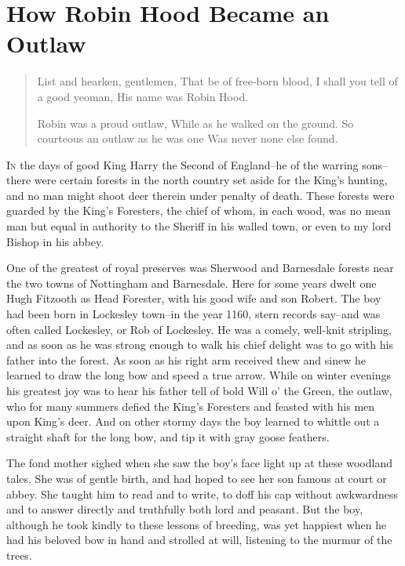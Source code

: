 \chapter{How Robin Hood Became an Outlaw}

\begin{quote}
List and hearken, gentlemen,
That be of free-born blood,
I shall you tell of a good yeoman,
His name was Robin Hood.

Robin was a proud outlaw,
While as he walked on the ground.
So courteous an outlaw as he was one
Was never none else found.
\end{quote}

\lettrine{I}{n} the days of good King Harry the Second of England--he of the warring
sons--there were certain forests in the north country set aside for the
King's hunting, and no man might shoot deer therein under penalty of
death. These forests were guarded by the King's Foresters, the chief of
whom, in each wood, was no mean man but equal in authority to the
Sheriff in his walled town, or even to my lord Bishop in his abbey.

One of the greatest of royal preserves was Sherwood and Barnesdale
forests near the two towns of Nottingham and Barnesdale. Here for some
years dwelt one Hugh Fitzooth as Head Forester, with his good wife and
son Robert. The boy had been born in Lockesley town--in the year 1160,
stern records say--and was often called Lockesley, or Rob of Lockesley.
He was a comely, well-knit stripling, and as soon as he was strong
enough to walk his chief delight was to go with his father into the
forest. As soon as his right arm received thew and sinew he learned to
draw the long bow and speed a true arrow. While on winter evenings his
greatest joy was to hear his father tell of bold Will o' the Green, the
outlaw, who for many summers defied the King's Foresters and feasted
with his men upon King's deer. And on other stormy days the boy learned
to whittle out a straight shaft for the long bow, and tip it with gray
goose feathers.

The fond mother sighed when she saw the boy's face light up at these
woodland tales. She was of gentle birth, and had hoped to see her son
famous at court or abbey. She taught him to read and to write, to doff
his cap without awkwardness and to answer directly and truthfully both
lord and peasant. But the boy, although he took kindly to these lessons
of breeding, was yet happiest when he had his beloved bow in hand and
strolled at will, listening to the murmur of the trees.


